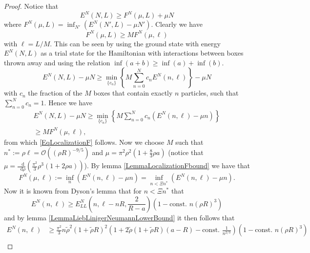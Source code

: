 \documentclass[a4paper,11pt]{article}
\newcommand*\diff{\mathop{}\!\mathrm{d}}
\numberwithin{equation}{section}
\begin{document}
	\begin{proof}
		Notice that \begin{equation}
		E^N(N,L)\geq F^N(\mu,L)+\mu N
		\end{equation}
		where $ F^N(\mu,L)=\inf_{N'}\left(E^N(N',L)-\mu N'\right) $. Clearly we have \begin{equation}
		F^N(\mu,L)\geq M F^N(\mu,\ell)\label{EqLocalizationF}
		\end{equation}
		with $ \ell=L/M $. This can be seen by using the ground state with energy $ E^N(N,L) $ as a trial state for the Hamiltonian with interactions between boxes thrown away and using the relation $ \inf(a+b)\geq \inf(a)+\inf(b) $.\begin{equation}
		E^N(N,L)-\mu N\geq \min_{\{c_n\}}\left\{M\sum_{n=0}^{N}c_n E^N(n,\ell)\right\}-\mu N
		\end{equation}
		with $ c_n $ the fraction of the $ M $ boxes that contain exactly $ n $ particles, such that $ \sum_{n=0}^{N}c_n=1 $. Hence we have \begin{equation}
	\begin{aligned}
		E^N(N,L)-\mu N\geq\min_{\{c_n\}}\left\{M\sum_{n=0}^{N}c_n \left(E^N(n,\ell)-\mu n\right)\right\}\\
		\geq MF^{N}(\mu,\ell),
	\end{aligned}
		\end{equation}
		from which \eqref{EqLocalizationF} follows. Now we choose $ M $ such that $ n^*:=\rho\ell=\mathcal{O}\left(\left(\rho R\right)^{-9/5}\right) $ and $ \mu=\pi^2\rho^2\left(1+\frac{8}{3}\rho a\right) $ (notice that $ \mu=\frac{\diff}{\diff \rho}(\frac{\pi^2}{3}\rho^3(1+2\rho a))$). By lemma \ref{LemmaLocalizationFbound} we have that \begin{equation}
		F^N(\mu,\ell):=\inf_{n}\left(E^N(n,\ell)-\mu n\right)=\inf_{n<\Xi n^*}\left(E^N(n,\ell)-\mu n\right).
		\end{equation}
		Now it is known from Dyson's lemma that for $ n<\Xi n^* $ that \begin{equation}
		E^{N}(n,\ell)\geq E^N_{LL}\left(n,\ell-nR,\frac{2}{R-a}\right)\left(1-\text{const. }n(\rho R)^{3}\right)
		\end{equation}
		and by lemma \ref{LemmaLiebLinigerNeumannLowerBound} it then follows that \begin{equation}
		\begin{aligned}
		E^{N}(n,\ell)&\geq\frac{\pi^2}{3}n\tilde{\rho}^2(1+\tilde{\rho} R)^2\left(1+2\tilde{\rho}(1+\tilde{\rho} R)(a-R)-\text{const. }\frac{1}{n^{2/3}}\right)\left(1-\text{const. }n(\rho R)^{3}\right)\\

\end{aligned}
\end{equation}
\end{proof}
\end{document}
